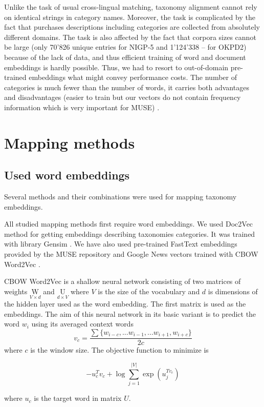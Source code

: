 \documentclass[conference]{IEEEtran}
\begin{document}
Unlike the task of usual cross-lingual matching, taxonomy alignment cannot rely on identical strings in category names. Moreover, the task is complicated by the fact that purchases descriptions including categories are collected from absolutely different domains. The task is also affected by the fact that corpora sizes cannot be large (only 70'826 unique entries for NIGP-5 and 1'124'338 -- for OKPD2) because of the lack of data, and thus efficient training of word and document embeddings is hardly possible. Thus, we had to resort to out-of-domain pre-trained embeddings what might convey performance costs. The number of categories is much fewer than the number of words, it carries both advantages and disadvantages (easier to train but our vectors do not contain frequency information which is very important for MUSE) \cite{ruder-muse-limitations}.

\section{Mapping methods}

\subsection{Used word embeddings}

Several methods and their combinations were used for mapping taxonomy embeddings.

All studied mapping methods first require word embeddings. We used Doc2Vec \cite{doc2vec} method for getting embeddings describing taxonomies categories. It was trained with library Gensim \cite{gensim}. We have also used pre-trained FastText \cite{fasttext} embeddings provided by the MUSE repository and Google News vectors trained with CBOW Word2Vec \cite{mikolov2013}. 

CBOW Word2Vec is a shallow neural network consisting of two matrices of weights $\underset{V\times d}{\mathrm{W}}$ and $\underset{d\times V}{\mathrm{U}}$ where $V$ is the size of the vocabulary and $d$ is dimensions of the hidden layer used as the word embedding.
The first matrix is used as the embeddings.
The aim of this neural network in its basic variant is to predict the word $w_i$ using its averaged context words
$$v_c = \dfrac{\sum\{w_{i-c},...w_{i-1},...w_{i+1}, w_{i+c}\}}{2c}$$
where $c$ is the window size. The objective function to minimize is

$$ -u_c^Tv_c + \log \sum_{j=1}^{|V|}\exp(u_j^{Tv_c})$$

where $u_c$ is the target word in matrix $U$.
\end{document}
